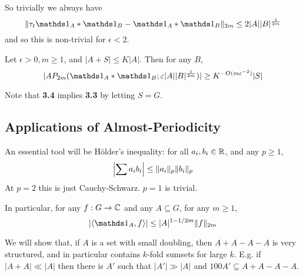 \documentclass[10pt,a4paper]{article}
\begin{document}
So trivially we always have
\[\norm{\tau_t \one_A \ast \one_B - \one_A\ast \one_B}_{2m} \leq 2|A||B|^{\frac{1}{2m}}\]
and so this is non-trivial for $\epsilon <2$.
\begin{theorem}
  Let $\epsilon > 0, m\geq 1$, and $|A+S|\leq K|A|$. Then for any $B$,
  \[|AP_{2m}(\one_A\ast \one_B; \epsilon |A||B|^{\frac{1}{2m}})| \geq K^{-O(m\epsilon^{-2})}|S|\]
\end{theorem}
Note that \textbf{3.4} implies \textbf{3.3} by letting $S=G$.

\subsection{Applications of Almost-Periodicity}
An essential tool will be H\"older's inequality: for all $a_i, b_i \in \mathbb{R}$, and any $p \geq 1$,
\[\left|\sum a_i b_i\right| \leq \lVert a_i\rVert_p \lVert b_i\rVert_p\]
At $p=2$ this is just Cauchy-Schwarz. $p=1$ is trivial.

In particular, for any $f:G \to \mathbb{C}$ and any $A \subseteq G$, for any $m \geq 1$,
\[|\angle{\one_A, f}| \leq |A|^{1-1/2m}\norm{f}_{2m}\]

We will show that, if $A$ is a set with small doubling, then $A+A-A-A$ is very structured, and in particular contains $k$-fold sumsets for large $k$. E.g. if $|A+A|\ll |A|$ then there is $A'$ such that $|A'|\gg |A|$ and $100A' \subseteq A+A-A-A$.
\end{document}
